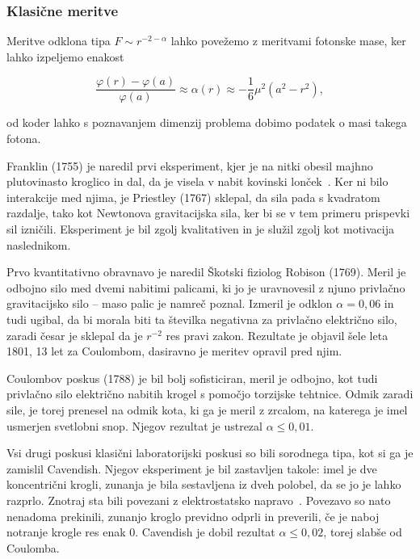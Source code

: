 \documentclass[a4paper, twocolumn, titlepage]{article}
\begin{document}
\subsubsection{Klasične meritve}

Meritve odklona tipa $F \sim r^{-2 - \alpha}$ lahko povežemo z meritvami fotonske mase, ker lahko izpeljemo enakost~\cite{over}

\begin{equation}
	\frac{\varphi(r) - \varphi(a)}{\varphi(a)} \approx \alpha(r) \approx -\frac{1}{6}\mu^2(a^2 - r^2),
\end{equation}

od koder lahko s poznavanjem dimenzij problema dobimo podatek o masi takega fotona.

Franklin (1755) je naredil prvi eksperiment, kjer je na nitki obesil majhno plutovinasto kroglico in dal, da je visela v nabit
kovinski lonček~\cite{over}. Ker ni bilo interakcije med njima, je Priestley (1767) sklepal, da sila pada s kvadratom razdalje,
tako kot Newtonova gravitacijska sila, ker bi se v tem primeru prispevki sil izničili. Eksperiment je bil zgolj kvalitativen in je
služil zgolj kot motivacija naslednikom.

Prvo kvantitativno obravnavo je naredil Škotski fiziolog Robison (1769). Meril je odbojno silo med dvemi nabitimi palicami, ki jo
je uravnovesil z njuno privlačno gravitacijsko silo -- maso palic je namreč poznal. Izmeril je odklon $\alpha = 0,06$ in tudi
ugibal, da bi morala biti ta številka negativna za privlačno električno silo, zaradi česar je sklepal da je $r^{-2}$ res pravi
zakon. Rezultate je objavil šele leta 1801, 13 let za Coulombom, dasiravno je meritev opravil pred njim.

Coulombov poskus (1788) je bil bolj sofisticiran, meril je odbojno, kot tudi privlačno silo električno nabitih krogel s pomočjo
torzijske tehtnice. Odmik zaradi sile, je torej prenesel na odmik kota, ki ga je meril z zrcalom, na katerega je imel usmerjen
svetlobni snop. Njegov rezultat je ustrezal $\alpha \leq 0,01$.

Vsi drugi poskusi klasični laboratorijski poskusi so bili sorodnega tipa, kot si ga je zamislil Cavendish. Njegov eksperiment je
bil zastavljen takole: imel je dve koncentrični krogli, zunanja je bila sestavljena iz dveh polobel, da se jo je lahko razprlo.
Znotraj sta bili povezani z elektrostatsko napravo~\cite{over}. Povezavo so nato nenadoma prekinili, zunanjo kroglo previdno odprli
in preverili, če je naboj notranje krogle res enak 0. Cavendish je dobil rezultat $\alpha \leq 0,02$, torej slabše od Coulomba.
\end{document}
